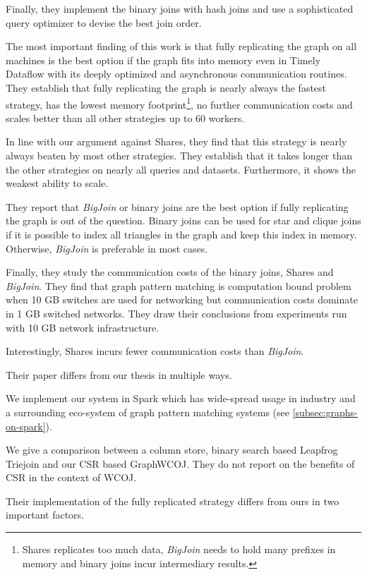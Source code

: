 Finally, they implement the binary joins with hash joins and use a sophisticated query optimizer
to devise the best join order.

The most important finding of this work is that fully replicating the graph on all machines
is the best option if the graph fits into memory even in Timely Dataflow with its deeply
optimized and asynchronous communication routines.
They establish that fully replicating the graph is nearly always the fastest strategy,
has the lowest memory footprint\footnote{Shares replicates too much data,
\textit{BigJoin} needs to hold many prefixes in memory and binary joins incur intermediary results.}, no
further
communication costs and scales better
than
all other strategies up to 60 workers.

In line with our argument against Shares, they find that this strategy is nearly always
beaten by most other strategies.
They establish that it takes longer than the other strategies on nearly all queries and datasets.
Furthermore, it shows the weakest ability to scale.

They report that \textit{BigJoin} or binary joins are the best option if fully
replicating the graph is out of the question.
Binary joins can be used for star and clique joins if it is possible to index all triangles in
the graph and keep this index in memory.
Otherwise, \textit{BigJoin} is preferable in most cases.

Finally, they study the communication costs of the binary joins, Shares and \textit{BigJoin}.
They find that graph pattern matching is computation bound problem when 10 GB switches are used
for networking but communication costs dominate in 1 GB switched networks.
They draw their conclusions from experiments run with 10 GB network infrastructure.

Interestingly, Shares incurs fewer communication costs than \textit{BigJoin}.

Their paper differs from our thesis in multiple ways.

We implement our system in Spark which has wide-spread usage in industry and a surrounding eco-system
of graph pattern matching systems (see \cref{subsec:graphs-on-spark}).

We give a comparison between a column store, binary search based Leapfrog Triejoin and
our \textsc{CSR} based GraphWCOJ.
They do not report on the benefits of \textsc{CSR} in the context of \textsc{WCOJ}.

Their implementation of the fully replicated strategy differs from ours in two important factors.

